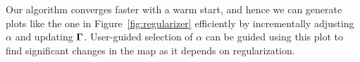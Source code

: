 Our algorithm converges faster with a warm start, and hence we can generate plots like the one in Figure~\ref{fig:regularizer} efficiently by incrementally adjusting $\alpha$ and updating $\mathbf \Gamma$.  User-guided selection of $\alpha$ can be guided using this plot to find significant changes in the map as it depends on regularization.



%
%
%
%

